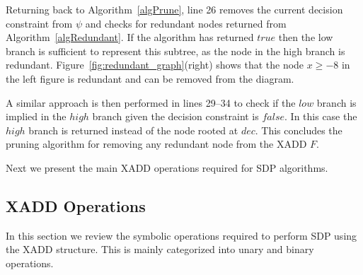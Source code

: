 \documentclass[twoside,11pt]{article}
\begin{document}
Returning back to Algorithm~\ref{algPrune}, line 26 removes the current decision constraint from $\psi$ and checks for redundant nodes returned from Algorithm~\ref{algRedundant}. If the algorithm has returned $\mathit{true}$ then the low branch is sufficient to represent this subtree, as the node in the high branch is redundant. Figure~\ref{fig:redundant_graph}(right) shows that the node $x\geq -8$ in the left figure is redundant and can be removed from the diagram. 

A similar approach is then performed in lines 29--34 to check if the $low$ branch is implied in the $high$ branch given the decision constraint is $\mathit{false}$. In this case the $high$ branch is returned instead of the node rooted at $\mathit{dec}$. This concludes the pruning algorithm for removing any redundant node from the XADD $F$. 

Next we present the main XADD operations required for SDP algorithms.

\subsection{XADD Operations}
\label{sec:xaddoperations}
In this section we review the symbolic operations required to perform SDP using the XADD structure. This is mainly categorized into unary and binary operations.   
\end{document}

